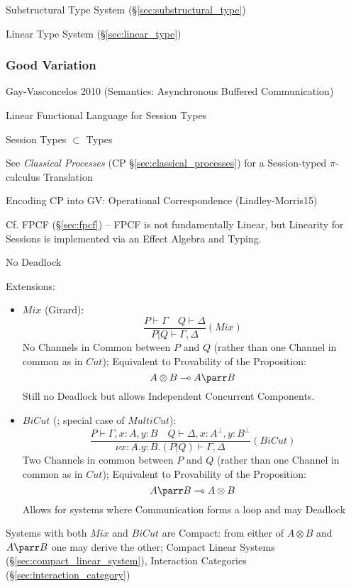 Substructural Type System (\S\ref{sec:substructural_type})

Linear Type System (\S\ref{sec:linear_type})



\subsubsection{Good Variation}\label{sec:good_variation}
\cite{wadler12}

Gay-Vasconcelos 2010 (Semantics: Asynchronous Buffered
Communication) %

Linear Functional Language for Session Types

Session Types $\subset$ Types

\fist See \emph{Classical Processes} (CP
\S\ref{sec:classical_processes}) for a Session-typed $\pi$-calculus
Translation

Encoding CP into GV: Operational Correspondence (Lindley-Morris15)

\fist Cf. FPCF (\S\ref{sec:fpcf}) \cite{orchard-yoshida16} -- FPCF is
not fundamentally Linear, but Linearity for Sessions is implemented
via an Effect Algebra and Typing.

No Deadlock

Extensions:
\begin{itemize}
  \item $Mix$ (Girard):
\[
  \frac{P \vdash \Gamma \quad Q \vdash \Delta}
  {P | Q \vdash \Gamma, \Delta} (Mix)
\]
    No Channels in Common between $P$ and $Q$ (rather than one Channel
    in common as in $Cut$); Equivalent to Provability of the
    Proposition:
\[
  A \otimes B \multimap A \parr B
\]
    Still no Deadlock but allows Independent Concurrent Components.
  \item $BiCut$ (\cite{abramsky-gay-nagarajan96}; special case of
    $MultiCut$):
\[
  \frac{P \vdash \Gamma, x:A, y:B \quad
    Q \vdash \Delta, x:A^\bot, y:B^\bot}
  {\nu x:A.y:B.(P|Q) \vdash \Gamma, \Delta} (BiCut)
\]
    Two Channels in common between $P$ and $Q$ (rather than one
    Channel in common as in $Cut$); Equivalent to Provability of the
    Proposition:
\[
  A \parr B \multimap A \otimes B
\]
    Allows for systems where Communication forms a loop and may
    Deadlock
\end{itemize}

Systems with both $Mix$ and $BiCut$ are Compact: from either of $A
\otimes B$ and $A \parr B$ one may derive the other;
Compact Linear Systems (\S\ref{sec:compact_linear_system}),
Interaction Categories (\S\ref{sec:interaction_category})

